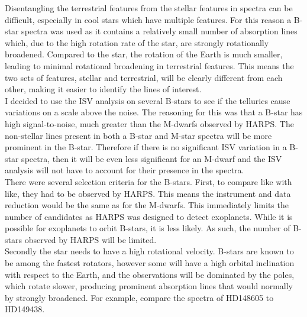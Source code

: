 Disentangling the terrestrial features from the stellar features in spectra can be difficult, especially in cool stars which have multiple features. For this reason a B-star spectra was used as it contains a relatively small number of absorption lines which, due to the high rotation rate of the star, are strongly rotationally broadened. Compared to the star, the rotation of the Earth is much smaller, leading to minimal rotational broadening in terrestrial features. This means the two sets of features, stellar and terrestrial, will be clearly different from each other, making it easier to identify the lines of interest.\\

I decided to use the ISV analysis on several B-stars to see if the tellurics cause variations on a scale above the noise. The reasoning for this was that a B-star has high signal-to-noise, much greater than the M-dwarfs observed by HARPS. The non-stellar lines present in both a B-star and M-star spectra will be more prominent in the B-star. Therefore if there is no significant ISV variation in a B-star spectra, then it will be even less significant for an M-dwarf and the ISV analysis will not have to account for their presence in the spectra.\\

There were several selection criteria for the B-stars. First, to compare like with like, they had to be observed by HARPS. This means the instrument and data reduction would be the same as for the M-dwarfs. This immediately limits the number of candidates as HARPS was designed to detect exoplanets. While it is possible for exoplanets to orbit B-stars, it is less likely. As such, the number of B-stars observed by HARPS will be limited.\\

Secondly the star needs to have a high rotational velocity. B-stars are known to be among the fastest rotators, however some will have a high orbital inclination with respect to the Earth, and the observations will be dominated by the poles, which rotate slower, producing prominent absorption lines that would normally by strongly broadened. For example, compare the spectra of HD148605 to HD149438.\\

